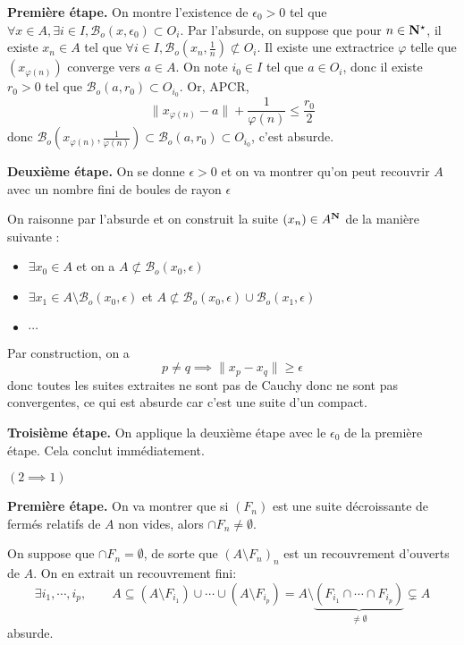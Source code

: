 \textbf{Première étape.} On montre l'existence de $\epsilon_0>0$ tel que  $ \forall x \in  A, \exists  i \in  I, \mathcal  B_o(x, \epsilon_0)\subset O_i$. Par l'absurde, on suppose que pour $ n \in \mathbf N^\star$, il existe $x_n \in  A$ tel que $ \forall  i \in  I, \mathcal  B_o(x_n, \frac{1}{n})\not\subset O_i$. Il existe une extractrice $\varphi$ telle que  $(x_{\varphi(n)})$ converge vers $a \in  A$. On note $i_0 \in  I$ tel que $ a \in  O_i$, donc il existe $r_0>0$ tel que  $\mathcal  B_o(a, r_0) \subset O_{i_0}$. Or, APCR,  \[
    \|x_{\varphi(n)}-a\|+\frac{1}{\varphi(n)}\leq \frac{r_0}{2}
\] 
donc $\mathcal  B_o(x_{\varphi(n)},\frac{1}{\varphi(n)})\subset \mathcal B_o(a,r_0)\subset O_{i_0}$, c'est absurde.

\textbf{Deuxième étape.}  On se donne $\epsilon>0$ et on va montrer qu'on peut recouvrir  $A$ avec un nombre fini de boules de rayon  $\epsilon$

On raisonne par l'absurde et on construit la suite  $(x_n) \in  A^{\mathbf N}$ de la manière suivante : \begin{itemize}
    \item $ \exists x_0 \in  A$ et on a $A\not\subset \mathcal  B_o(x_0,\epsilon)$
    \item $ \exists  x_1 \in  A\setminus \mathcal  B_o(x_0, \epsilon)$ et $A\not\subset \mathcal  B_o(x_0,\epsilon)\cup \mathcal  B_o(x_1,\epsilon)$
    \item $\cdots $
\end{itemize}
Par construction, on a \[
p\neq q \implies \|x_p-x_q\|\geq \epsilon
\] 
donc toutes les suites extraites ne sont pas de Cauchy donc ne sont pas convergentes, ce qui est absurde car c'est une suite d'un compact.

\textbf{Troisième étape.} On applique la deuxième étape avec le $\epsilon_0$ de la première étape. Cela conclut immédiatement. 

\boldmath$(2 \implies  1)$ \unboldmath

\textbf{Première étape.} On va montrer que si $(F_n)$ est une suite décroissante de fermés relatifs de $A$ non vides, alors $\cap F_n\neq \emptyset$.

On suppose que  $\cap F_n=\emptyset$, de sorte que  $(A\setminus F_n)_n$ est un recouvrement d'ouverts de $A$. On en extrait un recouvrement fini:  \[
    \exists  i_1,\cdots ,i_p, \qquad  A\subseteq (A\setminus F_{i_1})\cup \cdots \cup (A\setminus F_{i_p})=A\setminus\underbrace{(F_{i_1}\cap \cdots \cap F_{i_p})}_{\neq \emptyset } \subsetneq A
\] 
absurde.

